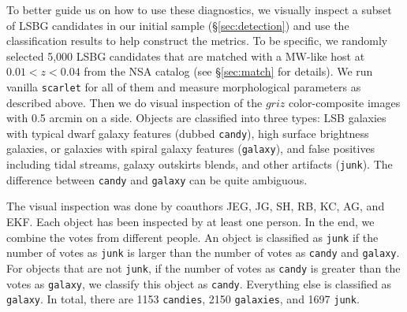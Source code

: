 \documentclass[twocolumn,astrosymb,twocolappendix]{aastex631}
\newcommand{\code}[1]{\texttt{#1}}
\begin{document}
\begin{CJK*}{UTF8}{gbsn}
To better guide us on how to use these diagnostics, we visually inspect a subset of LSBG candidates in our initial sample (\S \ref{sec:detection}) and use the classification results to help construct the metrics. To be specific, we randomly selected 5,000 LSBG candidates that are matched with a MW-like host at $0.01 < z < 0.04$ from the NSA catalog (see \S\ref{sec:match} for details). We run vanilla \code{scarlet} for all of them and measure morphological parameters as described above. Then we do visual inspection of the $griz$ color-composite images with 0.5 arcmin on a side. Objects are classified into three types: LSB galaxies with typical dwarf galaxy features (dubbed \code{candy}), high surface brightness galaxies, or galaxies with spiral galaxy features (\code{galaxy}), and false positives including tidal streams, galaxy outskirts blends, and other artifacts (\code{junk}). The difference between \code{candy} and \code{galaxy} can be quite ambiguous. 

The visual inspection was done by coauthors JEG, JG, SH, RB, KC, AG, and EKF. Each object has been inspected by at least one person. In the end, we combine the votes from different people. An object is classified as \code{junk} if the number of votes as \code{junk} is larger than the number of votes as \code{candy} and \code{galaxy}. For objects that are not \code{junk}, if the number of votes as \code{candy} is greater than the votes as \code{galaxy}, we classify this object as \code{candy}. Everything else is classified as \code{galaxy}. In total, there are 1153 \code{candies}, 2150 \code{galaxies}, and 1697 \code{junk}. 


\end{CJK*}
\end{document}
